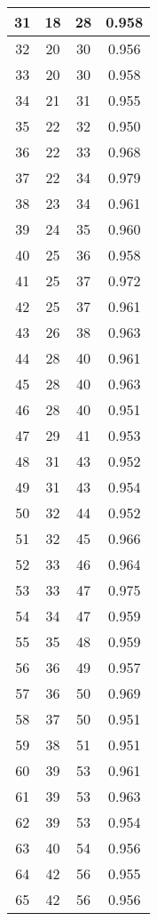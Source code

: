 \begin{table}
\begin{tabular}{|c|c|c|c|}
 31  & 18  & 28 & 0.958  \\ \hline
 32  & 20  & 30 & 0.956  \\ \hline
 33  & 20  & 30 & 0.958  \\ \hline
 34  & 21  & 31 & 0.955  \\ \hline
 35  & 22  & 32 & 0.950  \\ \hline
 36  & 22  & 33 & 0.968  \\ \hline
 37  & 22  & 34 & 0.979  \\ \hline
 38  & 23  & 34 & 0.961  \\ \hline
 39  & 24  & 35 & 0.960  \\ \hline
 40  & 25  & 36 & 0.958  \\ \hline
 41  & 25  & 37 & 0.972  \\ \hline
 42  & 25  & 37 & 0.961  \\ \hline
 43  & 26  & 38 & 0.963  \\ \hline
 44  & 28  & 40 & 0.961  \\ \hline
 45  & 28  & 40 & 0.963  \\ \hline
 46  & 28  & 40 & 0.951  \\ \hline
 47  & 29  & 41 & 0.953  \\ \hline
 48  & 31  & 43 & 0.952  \\ \hline
 49  & 31  & 43 & 0.954  \\ \hline
 50  & 32  & 44 & 0.952  \\ \hline
 51  & 32  & 45 & 0.966  \\ \hline
 52  & 33  & 46 & 0.964  \\ \hline
 53  & 33  & 47 & 0.975  \\ \hline
 54  & 34  & 47 & 0.959  \\ \hline
 55  & 35  & 48 & 0.959  \\ \hline
 56  & 36  & 49 & 0.957  \\ \hline
 57  & 36  & 50 & 0.969  \\ \hline
 58  & 37  & 50 & 0.951  \\ \hline
 59  & 38  & 51 & 0.951  \\ \hline
 60  & 39  & 53 & 0.961  \\ \hline
 61  & 39  & 53 & 0.963  \\ \hline
 62  & 39  & 53 & 0.954  \\ \hline
 63  & 40  & 54 & 0.956  \\ \hline
 64  & 42  & 56 & 0.955  \\ \hline
 65  & 42  & 56 & 0.956  \\ \hline

\end{tabular}
\end{table}
